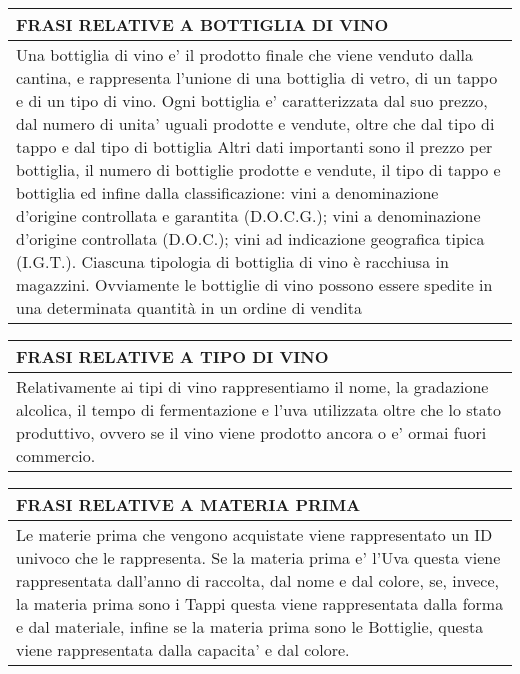 \begin{center}
	\begin{tabular}{P{16cm}}
		\toprule
		 \textbf {\large {FRASI RELATIVE A BOTTIGLIA DI VINO}} \\
		\midrule
		Una bottiglia di vino e' il prodotto finale che viene venduto dalla cantina, e rappresenta l'unione di una bottiglia di vetro, di un tappo e di un tipo di vino. Ogni bottiglia e' caratterizzata dal suo prezzo, dal numero di unita' uguali prodotte e vendute, oltre che dal tipo di tappo e dal tipo di bottiglia 
		Altri dati importanti sono il prezzo per bottiglia, il numero di bottiglie prodotte e vendute, il tipo di tappo e bottiglia ed infine dalla classificazione: vini a denominazione d'origine controllata e garantita (D.O.C.G.); vini a denominazione d'origine controllata (D.O.C.); vini ad indicazione geografica tipica (I.G.T.). Ciascuna tipologia di bottiglia di vino è racchiusa in magazzini. Ovviamente le bottiglie di vino possono essere spedite in una determinata quantità in un ordine di vendita\\
		\bottomrule
	\end{tabular}

	\vspace{0.5cm}
	
	\begin{tabular}{P{16cm}}
		\toprule
		 \textbf {\large {FRASI RELATIVE A TIPO DI VINO}} \\
		\midrule
		Relativamente ai tipi di vino rappresentiamo il nome, la gradazione alcolica, il tempo di fermentazione e l'uva utilizzata oltre che lo stato produttivo, ovvero se il vino viene prodotto ancora o e' ormai fuori commercio. \\
		\bottomrule
	\end{tabular}

	\vspace{0.5cm}
	
	\begin{tabular}{P{16cm}}
		\toprule
		 \textbf {\large {FRASI RELATIVE A MATERIA PRIMA}} \\
		\midrule
		Le materie prima che vengono acquistate viene rappresentato un ID univoco che le rappresenta. Se la materia prima e' l'Uva questa viene rappresentata dall'anno di raccolta, dal nome e dal colore, se, invece, la materia prima sono i Tappi questa viene rappresentata dalla forma e dal materiale, infine se la materia prima sono le Bottiglie, questa viene rappresentata dalla capacita' e dal colore.\\
		\bottomrule
	\end{tabular}


\end{center}
